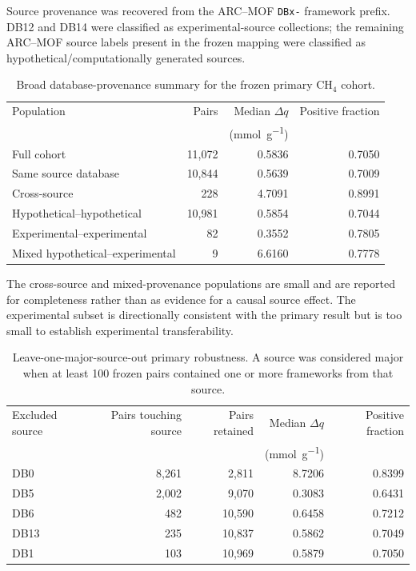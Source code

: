 \documentclass[11pt,a4paper]{article}
\begin{document}
Source provenance was recovered from the ARC--MOF \texttt{DBx-} framework prefix.
DB12 and DB14 were classified as experimental-source collections; the remaining
ARC--MOF source labels present in the frozen mapping were classified as
hypothetical/computationally generated sources.

\begin{table}[H]
\centering
\caption{Broad database-provenance summary for the frozen primary CH$_4$ cohort.}
\label{tab:S19}
\begin{tabular}{lrrr}
\toprule
Population & Pairs & Median $\Delta q$ & Positive fraction \\
 & & (\si{\milli\mole\per\gram}) & \\
\midrule
Full cohort & 11,072 & 0.5836 & 0.7050 \\
Same source database & 10,844 & 0.5639 & 0.7009 \\
Cross-source & 228 & 4.7091 & 0.8991 \\
Hypothetical--hypothetical & 10,981 & 0.5854 & 0.7044 \\
Experimental--experimental & 82 & 0.3552 & 0.7805 \\
Mixed hypothetical--experimental & 9 & 6.6160 & 0.7778 \\
\bottomrule
\end{tabular}
\end{table}

The cross-source and mixed-provenance populations are small and are reported for
completeness rather than as evidence for a causal source effect. The experimental
subset is directionally consistent with the primary result but is too small to
establish experimental transferability.

\begin{table}[H]
\centering
\caption{Leave-one-major-source-out primary robustness. A source was considered
major when at least 100 frozen pairs contained one or more frameworks from that
source.}
\label{tab:S20}
\begin{tabular}{lrrrr}
\toprule
Excluded source & Pairs touching source & Pairs retained &
Median $\Delta q$ & Positive fraction \\
 & & & (\si{\milli\mole\per\gram}) & \\
\midrule
DB0 & 8,261 & 2,811 & 8.7206 & 0.8399 \\
DB5 & 2,002 & 9,070 & 0.3083 & 0.6431 \\
DB6 & 482 & 10,590 & 0.6458 & 0.7212 \\
DB13 & 235 & 10,837 & 0.5862 & 0.7049 \\
DB1 & 103 & 10,969 & 0.5879 & 0.7050 \\
\bottomrule
\end{tabular}
\end{table}
\end{document}

